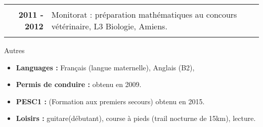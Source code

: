 \documentclass[10pt,a4paper]{report}
\def\sp{\vspace{6mm}}
\begin{document}
\begin{center}
\begin{tabular}{r p{12cm}}
& \\

\textbf{2011 - 2012} & Monitorat : préparation mathématiques au concours vétérinaire, L3 Biologie, Amiens.\\

& \\
\end{tabular}
\end{center}

























\sp
{\selectfont
\begin{Large}
Autres
\end{Large}
\hrulefill
}
\sp

\noindent
\begin{itemize}
\item \textbf{Languages :} Français (langue maternelle), Anglais (B2),
\item \textbf{Permis de conduire :} obtenu en 2009.
\item \textbf{PESC1 :} (Formation aux premiers secours) obtenu en 2015.
\item \textbf{Loisirs :} guitare(débutant), course à pieds (trail nocturne de 15km), lecture.
\end{itemize}
\end{document}
